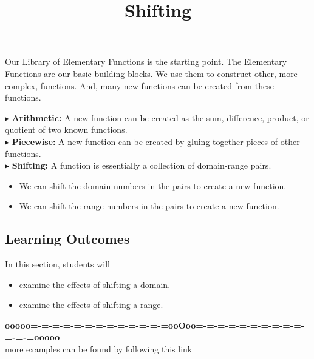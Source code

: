 \documentclass{ximera}
\title{Shifting}
\begin{document}
\begin{abstract}
\end{abstract}
\maketitle



Our Library of Elementary Functions is the starting point.  The Elementary Functions are our basic building blocks.  We use them to construct other, more complex, functions.  And, many new functions can be created from these functions.


$\blacktriangleright$ \textbf{Arithmetic:} A new function can be created as the sum, difference, product, or quotient of two known functions. \\


$\blacktriangleright$ \textbf{Piecewise:} A new function can be created by gluing together pieces of other functions.  \\


$\blacktriangleright$ \textbf{Shifting:}  A function is essentially a collection of domain-range pairs.  


\begin{itemize}
\item We can shift the domain numbers in the pairs to create a new function.
\item We can shift the range numbers in the pairs to create a new function.
\end{itemize}




\subsection{Learning Outcomes}


\begin{sectionOutcomes}
In this section, students will 

\begin{itemize}
\item examine the effects of shifting a domain.
\item examine the effects of shifting a range.
\end{itemize}
\end{sectionOutcomes}











\begin{center}
\textbf{\textcolor{green!50!black}{ooooo=-=-=-=-=-=-=-=-=-=-=-=-=ooOoo=-=-=-=-=-=-=-=-=-=-=-=-=ooooo}} \\

more examples can be found by following this link\\ 

\end{center}
\end{document}
